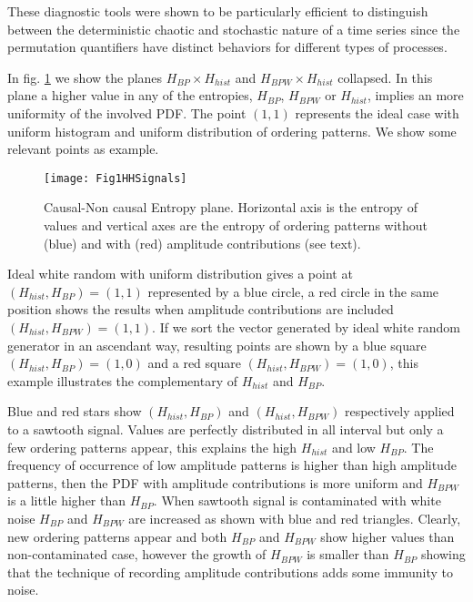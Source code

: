 These diagnostic tools were shown to be particularly efficient to distinguish between the deterministic chaotic and stochastic nature of a time series since the permutation quantifiers have distinct behaviors for different types of processes.

In fig. \ref{fig:HH} we show the planes $H_{BP} \times H_{hist}$ and $H_{BPW} \times H_{hist}$ collapsed.
In this plane a higher value in any of the entropies, $H_{BP}$, $H_{BPW}$ or $H_{hist}$, implies an more uniformity of the involved PDF.
The point $(1,1)$ represents the ideal case with uniform histogram and uniform distribution of ordering patterns.
We show some relevant points as example.
\begin{figure}[htpb]
	\centering	
	\texttt{[image: Fig1HHSignals]}
	\caption{Causal-Non causal Entropy plane. Horizontal axis is the entropy of values and vertical axes are the entropy of ordering patterns without (blue) and with (red) amplitude contributions (see text).}
	\label{fig:HH}
\end{figure}

Ideal white random with uniform distribution gives a point at $(H_{hist}, H_{BP})=(1, 1)$ represented by a blue circle, a red circle in the same position shows the results when amplitude contributions are included $(H_{hist}, H_{BPW})=(1, 1)$.
If we sort the vector generated by ideal white random generator in an ascendant way, resulting points are shown by a blue square $(H_{hist}, H_{BP})=(1, 0)$ and a red square $(H_{hist}, H_{BPW})=(1, 0)$, this example illustrates the complementary of $H_{hist}$ and $H_{BP}$.

Blue and red stars show $(H_{hist}, H_{BP})$ and $(H_{hist}, H_{BPW})$ respectively applied to a sawtooth signal.
Values are perfectly distributed in all interval but only a few ordering patterns appear, this explains the high $H_{hist}$ and low $H_{BP}$.
The frequency of occurrence of low amplitude patterns is higher than high amplitude patterns, then the PDF with amplitude contributions is more uniform and $H_{BPW}$ is a little higher than $H_{BP}$.
When sawtooth signal is contaminated with white noise $H_{BP}$ and $H_{BPW}$ are increased as shown with blue and red triangles.
Clearly, new ordering patterns appear and both $H_{BP}$ and $H_{BPW}$ show higher values than non-contaminated case, however the growth of $H_{BPW}$ is smaller than $H_{BP}$ showing that the technique of recording amplitude contributions adds some immunity to noise.

